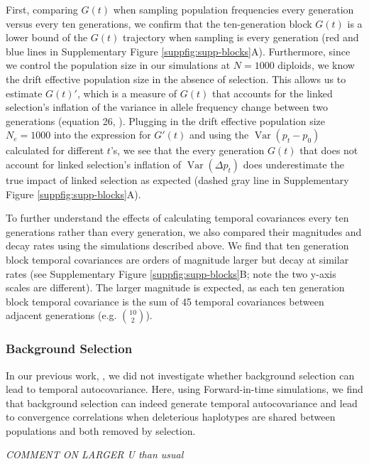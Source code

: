 \documentclass[11pt]{article}
\newcommand{\gc}[1]{{\it \color{red} #1 } }
\DeclareMathOperator{\var}{Var}
\begin{document}
{First, comparing $G(t)$ when sampling population frequencies every generation
versus every ten generations, we confirm that the ten-generation block $G(t)$
is a lower bound of the $G(t)$ trajectory when sampling is every generation
(red and blue lines in Supplementary Figure \ref{suppfig:supp-blocks}A).
Furthermore, since we control the population size in our simulations at $N =
1000$ diploids, we know the drift effective population size in the absence of
selection. This allows us to estimate $G(t)'$, which is a measure of $G(t)$
that accounts for the linked selection's inflation of the variance in allele
frequency change between two generations (equation 26, \cite{Buffalo2019-io}).
Plugging in the drift effective population size $N_e = 1000$ into the
expression for $G'(t)$ and using the $\var(p_t - p_0)$ calculated for different
$t$'s, we see that the every generation $G(t)$ that does not account for linked
selection's inflation of $\var(\Delta p_t)$ does underestimate the true impact
of linked selection as expected (dashed gray line in Supplementary Figure
\ref{suppfig:supp-blocks}A).

To further understand the effects of calculating temporal covariances every ten
generations rather than every generation, we also compared their magnitudes and
decay rates using the simulations described above. We find that ten generation
block temporal covariances are orders of magnitude larger but decay at similar
rates (see Supplementary Figure \ref{suppfig:supp-blocks}B; note the two y-axis
scales are different). The larger magnitude is expected, as each ten generation
block temporal covariance is the sum of 45 temporal covariances between
adjacent generations (e.g. $10 \choose 2$).

\subsubsection{Background Selection}

In our previous work, \textcite{Buffalo2019-io}, we did not investigate whether
background selection can lead to temporal autocovariance. Here, using
Forward-in-time simulations, we find that background selection can indeed
generate temporal autocovariance and lead to convergence correlations when
deleterious haplotypes are shared between populations and both removed by
selection. 

\gc{COMMENT ON LARGER U than usual}

}
\end{document}
